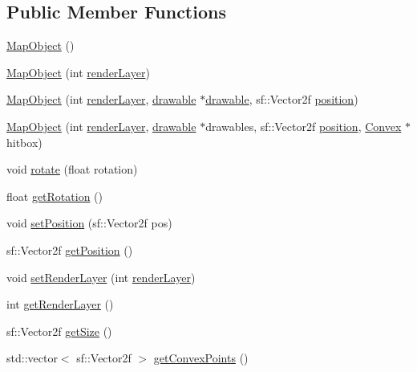 \subsection*{Public Member Functions}
\begin{DoxyCompactItemize}
\item 
\hyperlink{class_map_object_a568754515cc72ce0861d30c3040d26d2}{Map\+Object} ()
\item 
\hyperlink{class_map_object_a5d76c91462e7d408e31bae7e21b87384}{Map\+Object} (int \hyperlink{class_map_object_ac7431860a4ca955dc3db173926be3856}{render\+Layer})
\item 
\hyperlink{class_map_object_ad47fe6b8ac616573a504cb1f51fa567a}{Map\+Object} (int \hyperlink{class_map_object_ac7431860a4ca955dc3db173926be3856}{render\+Layer}, \hyperlink{classdrawable}{drawable} $\ast$\hyperlink{classdrawable}{drawable}, sf\+::\+Vector2f \hyperlink{class_map_object_a00491cbf8e4cbc729ef37e11f3473860}{position})
\item 
\hyperlink{class_map_object_a8708f12073b2fb345aa40a4d8780ef01}{Map\+Object} (int \hyperlink{class_map_object_ac7431860a4ca955dc3db173926be3856}{render\+Layer}, \hyperlink{classdrawable}{drawable} $\ast$drawables, sf\+::\+Vector2f \hyperlink{class_map_object_a00491cbf8e4cbc729ef37e11f3473860}{position}, \hyperlink{class_convex}{Convex} $\ast$hitbox)
\item 
void \hyperlink{class_map_object_a42beb1ad4f7eef28d82c3655dcecdad4}{rotate} (float rotation)
\item 
float \hyperlink{class_map_object_a0a682512b187bd372a2d62a277d2526c}{get\+Rotation} ()
\item 
void \hyperlink{class_map_object_a5f27e1a99b00925d5f04640cc88083f2}{set\+Position} (sf\+::\+Vector2f pos)
\item 
sf\+::\+Vector2f \hyperlink{class_map_object_a07d7b72ec87e0c58309c3539bdc79779}{get\+Position} ()
\item 
void \hyperlink{class_map_object_a0373284a30f47f85a33b9922042d8e25}{set\+Render\+Layer} (int \hyperlink{class_map_object_ac7431860a4ca955dc3db173926be3856}{render\+Layer})
\item 
int \hyperlink{class_map_object_a056a6d84523180e65cceda163fbf44d8}{get\+Render\+Layer} ()
\item 
sf\+::\+Vector2f \hyperlink{class_map_object_aae5aec063f4625f627a64065aa921495}{get\+Size} ()
\item 
std\+::vector$<$ sf\+::\+Vector2f $>$ \hyperlink{class_map_object_a54f4e0be03cf596ed4d3854ef212ca46}{get\+Convex\+Points} ()

\end{DoxyCompactItemize}
